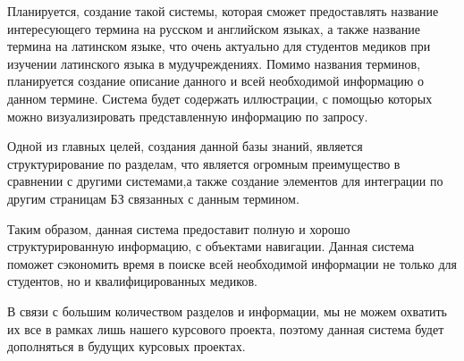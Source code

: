 Планируется, создание такой системы, которая сможет предоставлять название интересующего термина на русском и английском языках, а также название термина на латинском языке, что очень актуально для студентов медиков при изучении латинского языка в мудучреждениях. Помимо названия терминов, планируется создание описание данного и всей необходимой информацию о данном термине. Система будет содержать иллюстрации, с помощью которых можно визуализировать представленную информацию по запросу. 

Одной из главных целей, создания данной базы знаний, является структурирование по разделам, что является огромным преимущество в сравнении с другими системами,а также создание элементов для интеграции по другим страницам БЗ связанных с данным термином.

Таким образом, данная система предоставит полную и хорошо структурированную информацию, с объектами навигации. Данная система поможет сэкономить время в поиске всей необходимой информации не только для студентов, но и квалифицированных медиков.

В связи с большим количеством разделов и информации, мы не можем охватить их все в рамках лишь нашего курсового проекта, поэтому данная система будет дополняться в будущих курсовых проектах.
